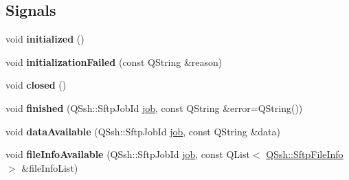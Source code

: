 \subsection*{Signals}
\begin{DoxyCompactItemize}
\item 
\mbox{\label{class_q_ssh_1_1_internal_1_1_sftp_channel_private_a74d0c2df0639130638856fb40e2da77d}} 
void {\bfseries initialized} ()
\item 
\mbox{\label{class_q_ssh_1_1_internal_1_1_sftp_channel_private_a054d9aff94ecfbefbc26c12272d7aed8}} 
void {\bfseries initialization\+Failed} (const Q\+String \&reason)
\item 
\mbox{\label{class_q_ssh_1_1_internal_1_1_sftp_channel_private_a5c3a43ac68c3691178a1f985ca5a1a24}} 
void {\bfseries closed} ()
\item 
\mbox{\label{class_q_ssh_1_1_internal_1_1_sftp_channel_private_ac4b5a73fd61ebf88d2ef11da3773de71}} 
void {\bfseries finished} (Q\+Ssh\+::\+Sftp\+Job\+Id \mbox{\hyperlink{structjob}{job}}, const Q\+String \&error=Q\+String())
\item 
\mbox{\label{class_q_ssh_1_1_internal_1_1_sftp_channel_private_a5b41b5a3c692eb1ebf40750088b74ff0}} 
void {\bfseries data\+Available} (Q\+Ssh\+::\+Sftp\+Job\+Id \mbox{\hyperlink{structjob}{job}}, const Q\+String \&data)
\item 
\mbox{\label{class_q_ssh_1_1_internal_1_1_sftp_channel_private_ad76c7720d12df7a33f78f542ffd5e865}} 
void {\bfseries file\+Info\+Available} (Q\+Ssh\+::\+Sftp\+Job\+Id \mbox{\hyperlink{structjob}{job}}, const Q\+List$<$ \mbox{\hyperlink{class_q_ssh_1_1_sftp_file_info}{Q\+Ssh\+::\+Sftp\+File\+Info}} $>$ \&file\+Info\+List)
\end{DoxyCompactItemize}
